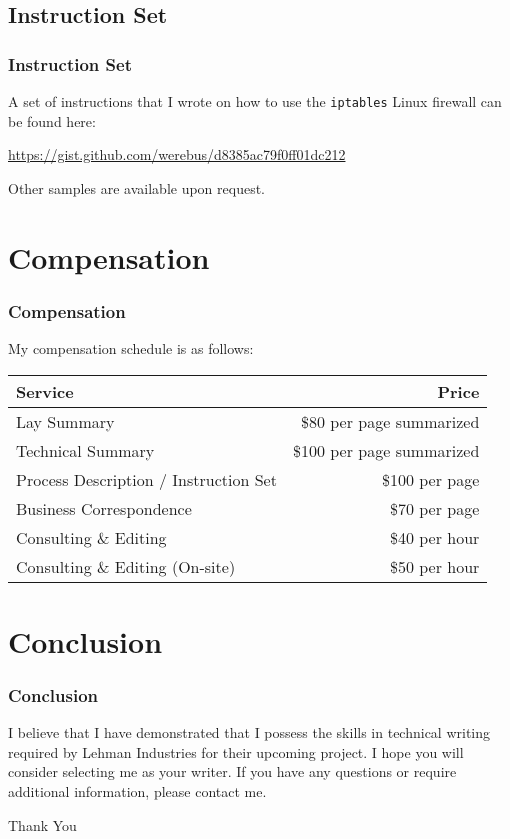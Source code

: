 \documentclass{beamer}
\begin{document}
\subsection{Instruction Set}
\begin{frame}
  \frametitle{Instruction Set}
  A set of instructions that I wrote on how to use the \texttt{iptables} Linux
  firewall can be found here:

  \href{https://gist.github.com/werebus/d8385ac79f0ff01dc212}%
       {https://gist.github.com/werebus/d8385ac79f0ff01dc212}
\end{frame}

\begin{frame}
  Other samples are available upon request.
\end{frame}

\section{Compensation}
\begin{frame}
  \frametitle{Compensation}
  My compensation schedule is as follows:
  \begin{center}
    \begin{tabular}[c]{|l|r|}
      \hline
      \textbf{Service} & \textbf{Price} \\ \hline
      Lay Summary & \$80 per page summarized \\
      Technical Summary & \$100 per page summarized \\
      Process Description / Instruction Set & \$100 per page  \\
      Business Correspondence & \$70 per page\\
      Consulting \& Editing & \$40 per hour \\
      Consulting \& Editing (On-site) & \$50 per hour \\
      \hline
    \end{tabular}
  \end{center}
\end{frame}
    
\section{Conclusion}
\begin{frame}
  \frametitle{Conclusion}
  I believe that I have demonstrated that I possess the skills in technical
  writing required by Lehman Industries for their upcoming project.  I hope
  you will consider selecting me as your writer.  If you have any questions or
  require additional information, please contact me.

  \begin{center}
    {\Large Thank You}
  \end{center}
\end{frame}
\end{document}
